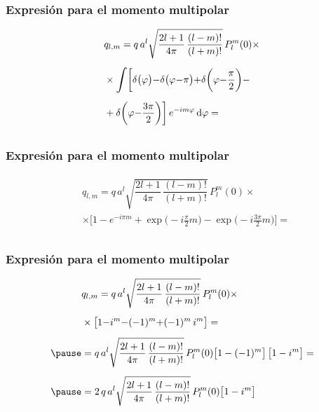 \documentclass[12pt]{beamer}
\begin{document}
\begin{frame}
\frametitle{Expresión para el momento multipolar}
\begin{eqnarray*}
\begin{aligned}
&q_{l, m} = q \, a^{l} \sqrt{\dfrac{2 l + 1}{4 \pi} \, \dfrac{(l - m)!}{(l + m)!}} \, P_{l}^{m} (0) \times \\[0.5em]
&\times \scaleint{6ex} \bigg[ \delta \big(\varphi \big) {-} \delta \big(\varphi {-} \pi \big) {+} \delta \bigg( \varphi {-} \dfrac{\pi}{2} \bigg) - \\[0.5em]
&+ \delta \bigg(\varphi {-} \dfrac{3 \pi}{2} \bigg) \bigg] \, e^{-i m \varphi} \dd{\varphi} = \\[0.5em]
\end{aligned}
\end{eqnarray*}
\end{frame}
\begin{frame}
\frametitle{Expresión para el momento multipolar}
\begin{eqnarray*}
\begin{aligned}
&q_{l,m} = q \, a^{l} \sqrt{\dfrac{2 l + 1}{4 \pi} \, \dfrac{(l - m)!}{(l + m)!}} \, P_{l}^{m} (0) \times \\[0.5em]
&\times \bigg[ 1 - e^{- i \pi m } + \exp \big(- i  \frac{\pi}{2} m \big) - \exp \big(- i \frac{3 \pi}{2} m \big) \bigg] = \\[0.5em] 
\end{aligned}
\end{eqnarray*}
\end{frame}
\begin{frame}
\frametitle{Expresión para el momento multipolar}
\begin{eqnarray*}
\begin{aligned}
&q_{l,m} = q \, a^{l} \sqrt{\dfrac{2 l + 1}{4 \pi} \, \dfrac{(l - m)!}{(l + m)!}} \, P_{l}^{m} (0) \times \\[0.5em]
&\times \big[ 1 {-} i^{m} {-} (-1)^{m} {+} (-1)^{m} \, i^{m}  \big] = \\[0.5em] \pause
&= q \, a^{l} \sqrt{\dfrac{2 l + 1}{4 \pi} \, \dfrac{(l - m)!}{(l + m)!}} \, P_{l}^{m} (0) \big[ 1 - (-1)^{m} \big] \, \big[ 1 - i^{m} \big] = \\[0.5em] \pause
&= 2 \, q \, a^{l} \sqrt{\dfrac{2 l + 1}{4 \pi} \, \dfrac{(l - m)!}{(l + m)!}}\, P_{l}^{m} (0) \big[ 1 - i^{m} \big]
\end{aligned}
\end{eqnarray*}
\end{frame}
\end{document}

